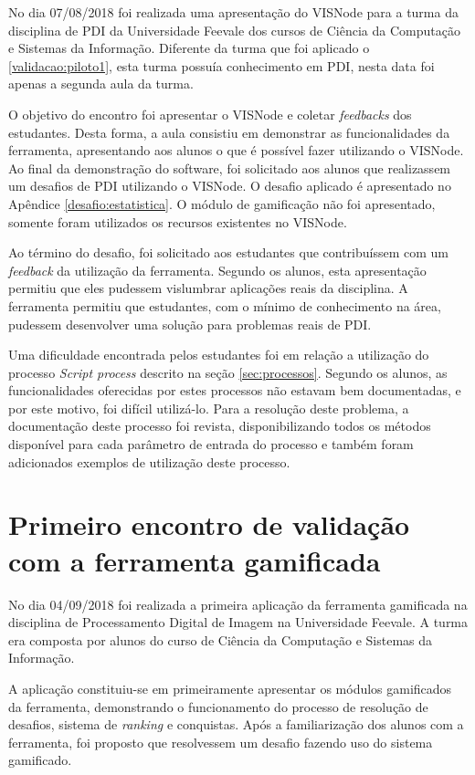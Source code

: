 \documentclass[
	12pt,				%
	oneside,			%
	a4paper,			%
	english,			%
	french,				%
	spanish,			%
	brazil,				%
	]{abntex2}
\begin{document}
No dia 07/08/2018 foi realizada uma apresentação do VISNode para a turma da disciplina de PDI da Universidade Feevale dos cursos de Ciência da Computação e Sistemas da Informação. Diferente da turma que foi aplicado o \ref{validacao:piloto1}, esta turma possuía conhecimento em PDI, nesta data foi apenas a segunda aula da turma. 

O objetivo do encontro foi apresentar o VISNode e coletar \textit{feedbacks} dos estudantes. Desta forma, a aula consistiu em demonstrar as funcionalidades da ferramenta, apresentando aos alunos o que é possível fazer utilizando o VISNode. Ao final da demonstração do software, foi solicitado aos alunos que realizassem um desafios de PDI utilizando o VISNode. O desafio aplicado é apresentado no Apêndice \ref{desafio:estatistica}. O módulo de gamificação não foi apresentado, somente foram utilizados os recursos existentes no VISNode.

Ao término do desafio, foi solicitado aos estudantes que contribuíssem com um \textit{feedback} da utilização da ferramenta. Segundo os alunos, esta apresentação permitiu que eles pudessem vislumbrar aplicações reais da disciplina. A ferramenta permitiu que estudantes, com o mínimo de conhecimento na área, pudessem desenvolver uma solução para problemas reais de PDI.

Uma dificuldade encontrada pelos estudantes foi em relação a utilização do processo \textit{Script process} descrito na seção \ref{sec:processos}. Segundo os alunos, as funcionalidades oferecidas por estes processos não estavam bem documentadas, e por este motivo, foi difícil utilizá-lo. Para a resolução deste problema, a documentação deste processo foi revista, disponibilizando todos os métodos disponível para cada parâmetro de entrada do processo e também foram adicionados exemplos de utilização deste processo.

\section{Primeiro encontro de validação com a ferramenta gamificada}

No dia 04/09/2018 foi realizada a primeira aplicação da ferramenta gamificada na disciplina de Processamento Digital de Imagem na Universidade Feevale. A turma era composta por alunos do curso de Ciência da Computação e Sistemas da Informação.

A aplicação constituiu-se em primeiramente apresentar os módulos gamificados da ferramenta, demonstrando o funcionamento do processo de resolução de desafios, sistema de \textit{ranking} e conquistas. Após a familiarização dos alunos com a ferramenta, foi proposto que resolvessem um desafio fazendo uso do sistema gamificado.
\end{document}
